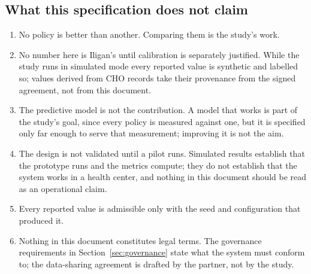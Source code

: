 \subsection{What this specification does not claim}
\begin{enumerate}[leftmargin=1.5em,itemsep=0.2em]
  \item No policy is better than another. Comparing them is the study's work.
  \item No number here is Iligan's until calibration is separately justified. While the study
    runs in simulated mode every reported value is synthetic and labelled so; values derived from
    CHO records take their provenance from the signed agreement, not from this document.
  \item The predictive model is not the contribution. A model that works is part of the
    study's goal, since every policy is measured against one, but it is specified only far
    enough to serve that measurement; improving it is not the aim.
  \item The design is not validated until a pilot runs. Simulated results establish that the
    prototype runs and the metrics compute; they do not establish that the system works in a
    health center, and nothing in this document should be read as an operational claim.
  \item Every reported value is admissible only with the seed and configuration that
    produced it.
  \item Nothing in this document constitutes legal terms. The governance requirements in
    Section~\ref{sec:governance} state what the system must conform to; the data-sharing
    agreement is drafted by the partner, not by the study.
\end{enumerate}
